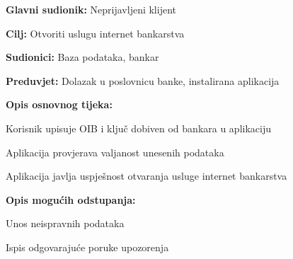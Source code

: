     			
    				\noindent {}
    			\begin{packed_item}
    				
    				\item \textbf{Glavni sudionik: }Neprijavljeni klijent
    				\item  \textbf{Cilj:} Otvoriti uslugu internet bankarstva
    				\item  \textbf{Sudionici:} Baza podataka, bankar
    				\item  \textbf{Preduvjet:} Dolazak u poslovnicu banke, instalirana aplikacija
    				\item  \textbf{Opis osnovnog tijeka:}
    				
    				\item[] \begin{packed_enum}
					
					\item Korisnik upisuje OIB i ključ dobiven od bankara u aplikaciju
					\item Aplikacija provjerava valjanost unesenih podataka
					\item Aplikacija javlja uspješnost otvaranja usluge internet bankarstva
					
				\end{packed_enum}
					
						\item  \textbf{Opis mogućih odstupanja:}
					
					\item[] \begin{packed_item}
						
						\item[2.a] Unos neispravnih podataka
						\item[] \begin{packed_enum}
							
							\item Ispis odgovarajuće poruke upozorenja
							
							
						\end{packed_enum}
						
						
					\end{packed_item}
				
					
					
				
			\end{packed_item}
		
			
			
			
				

